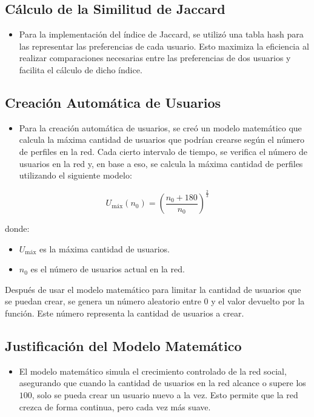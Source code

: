 \subsection*{Cálculo de la Similitud de Jaccard}

\begin{itemize}
    \item Para la implementación del índice de Jaccard, se utilizó una tabla hash para las representar las preferencias de cada usuario. Esto maximiza la eficiencia al realizar comparaciones necesarias entre las preferencias de dos usuarios y facilita el cálculo de dicho índice.
\end{itemize}

\subsection*{Creación Automática de Usuarios}

\begin{itemize}
    \item Para la creación automática de usuarios, se creó un modelo matemático que calcula la máxima cantidad de usuarios que podrían crearse según el número de perfiles en la red. Cada cierto intervalo de tiempo, se verifica el número de usuarios en la red y, en base a eso, se calcula la máxima cantidad de perfiles utilizando el siguiente modelo:
\end{itemize}

\[
U_{\text{máx}}(n_0) = \left(\frac{n_0 + 180}{n_0}\right)^{\frac{2}{3}}
\]

donde:
\begin{itemize}
    \item $U_{\text{máx}}$ es la máxima cantidad de usuarios.
    \item $n_0$ es el número de usuarios actual en la red.
\end{itemize}

Después de usar el modelo matemático para limitar la cantidad de usuarios que se puedan crear, se genera un número aleatorio entre \( 0 \) y el valor devuelto por la función. Este número representa la cantidad de usuarios a crear.

\subsection*{Justificación del Modelo Matemático}

\begin{itemize}
    \item El modelo matemático simula el crecimiento controlado de la red social, asegurando que cuando la cantidad de usuarios en la red alcance o supere los \( 100 \), solo se pueda crear un usuario nuevo a la vez. Esto permite que la red crezca de forma continua, pero cada vez más suave.
\end{itemize}

